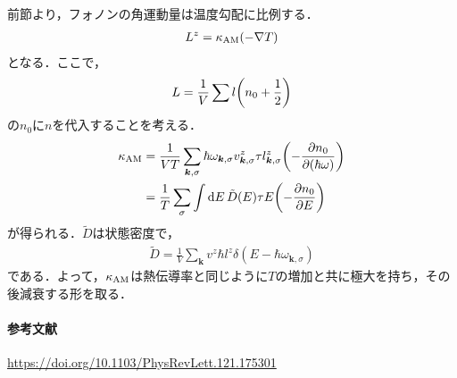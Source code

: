 \documentclass{report}
\begin{document}
前節より，フォノンの角運動量は温度勾配に比例する．
\begin{align}
  L^z = \kappa_{\mathrm{AM}} (-\nabla T)
\end{align}
となる．ここで，
\begin{align}
  L = \frac{1}{V} \sum l \qty(n_0 + \frac{1}{2})
\end{align}
の$n_0$に$n$を代入することを考える．
\begin{align}
  \kappa_{\mathrm{AM}} &= \frac{1}{VT} \sum_{\bm{k},\sigma} \hbar \omega_{\bm{k},\sigma} v_{\bm{k},\sigma}^z \tau l_{\bm{k},\sigma}^z \qty(-\pdv{n_0}{(\hbar\omega)})\\
  &= \frac{1}{T} \sum_{\sigma} \int \dd{E} \tilde{D}(E) \tau E \qty(-\pdv{n_0}{E})
\end{align}
が得られる．$\tilde{D}$は状態密度で，
\begin{align}
  \tilde{D} = \frac{1}{V} \sum_{\bm{k}} v^z \hbar l^z \delta(E - \hbar\omega_{\bm{k},\sigma})
\end{align}
である．よって，$\kappa_{\mathrm{AM}}$は熱伝導率と同じように$T$の増加と共に極大を持ち，その後減衰する形を取る．

\paragraph*{参考文献}
\url{https://doi.org/10.1103/PhysRevLett.121.175301}
\end{document}
